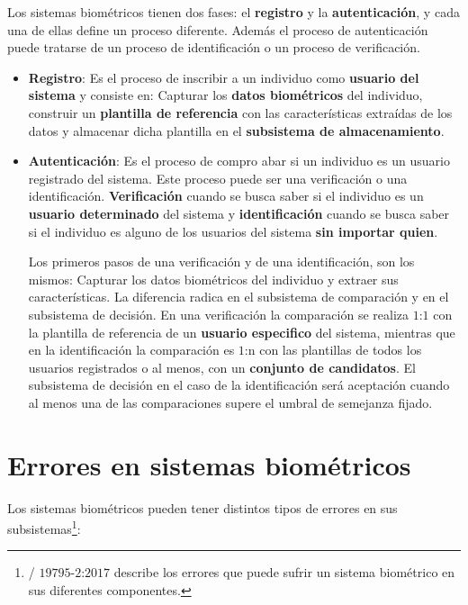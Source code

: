 Los sistemas biométricos tienen dos fases: el \textbf{registro} y la \textbf{autenticación}, y cada una de ellas define un proceso diferente. Además el proceso de autenticación puede tratarse de un proceso de identificación o un proceso de verificación.

\begin{itemize}
    \item 
    \textbf{Registro}:
    Es el proceso de inscribir a un individuo como \textbf{usuario del sistema} y consiste en: Capturar los \textbf{datos biométricos} del individuo, construir un \textbf{plantilla de referencia} con las características extraídas de los datos y almacenar dicha plantilla en el \textbf{subsistema de almacenamiento}. 
    \item 
    \textbf{Autenticación}:
    Es el proceso de compro abar si un individuo es un usuario registrado del sistema. Este proceso puede ser una verificación o una identificación. \textbf{Verificación} cuando se busca saber si el individuo es un \textbf{usuario determinado} del sistema y \textbf{identificación} cuando se busca saber si el individuo es alguno de los usuarios del sistema \textbf{sin importar quien}. 
    
    Los primeros pasos de una verificación y de una identificación, son los mismos: Capturar los datos biométricos del individuo y extraer sus características. La diferencia radica en el subsistema de comparación y en el subsistema de decisión. En una verificación la comparación se realiza $1$:$1$ con la plantilla de referencia de un \textbf{usuario especifico} del sistema, mientras que en la identificación la comparación es $1$:n con las plantillas de todos los usuarios registrados o al menos, con un \textbf{conjunto de candidatos}. El subsistema de decisión en el caso de la identificación será aceptación cuando al menos una de las comparaciones supere el umbral de semejanza fijado. 
\end{itemize}



\section{Errores en sistemas biométricos}\label{sec:ErroresSistemasBiometricos}   
   
Los sistemas biométricos pueden tener distintos tipos de errores en sus subsistemas\footnote{/ $19795$-$2$:$2017$ \cite{ISO/BiometricErrors} describe los errores que puede sufrir un sistema biométrico en sus diferentes componentes.}:

